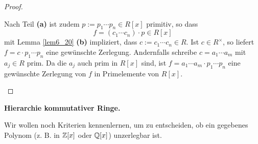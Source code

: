 \begin{proof}
\begin{enumerate}[label=(\alph*)]
		Nach Teil \textbf{(a)} ist zudem $p := p_1 \cdots p_n \in R[x]$ primitiv, so dass 
		\[f = (c_1 \cdots c_n) \cdot p \in R[x]\]
		mit Lemma \ref{lem6_20} \textbf{(b)} impliziert, dass $c := c_1 \cdots c_n \in R$. Ist $c \in R^\times$, so liefert $f = c\cdot p_1 \cdots p_n$ eine gewünschte Zerlegung. Andernfalls schreibe $c = a_1 \cdots a_m$ mit $a_j \in R$ prim. Da die $a_j$ auch prim in $R[x]$ sind, ist $f = a_1 \cdots a_m \cdot p_1 \cdots p_n$ eine gewünschte Zerlegung von $f$ in Primelemente von $R[x]$.
	\end{enumerate}
\end{proof}
\textbf{Hierarchie kommutativer Ringe. }


\begin{leftbar}
	Wir wollen noch Kriterien kennenlernen, um zu entscheiden, ob ein gegebenes Polynom (z. B. in $\mathbb{Z}[x]$ oder $\mathbb{Q}[x]$) unzerlegbar ist.
	
\end{leftbar}

